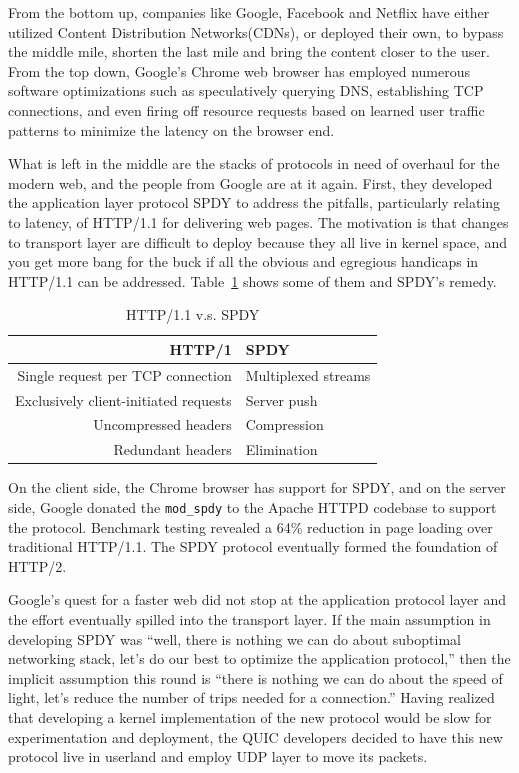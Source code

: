 \documentclass{sig-alternate-05-2015}
\begin{document}
From the bottom up, companies like Google, Facebook and Netflix have either utilized Content Distribution Networks(CDNs), or deployed their own, to bypass the middle mile, shorten the last mile and bring the content closer to the user. From the top down, Google's Chrome web browser has employed numerous software optimizations such as speculatively querying DNS, establishing TCP connections, and even firing off resource requests based on learned user traffic patterns to minimize the latency on the browser end.\cite{grigorik:chrome} 

What is left in the middle are the stacks of protocols in need of overhaul for the modern web, and the people from Google are at it again. First, they developed the application layer protocol SPDY to address the pitfalls, particularly relating to latency, of HTTP/1.1 for delivering web pages. The motivation is that changes to transport layer are difficult to deploy because they all live in kernel space, and you get more bang for the buck if all the obvious and egregious handicaps in HTTP/1.1 can be addressed. Table~\ref{tab:httpvspdy} shows some of them and SPDY's remedy.

\vspace*{-10pt}
\begin{table}[h]
\centering
\caption{HTTP/1.1 v.s. SPDY\cite{spdy}}
\label{tab:httpvspdy}
\begin{tabular}{|r|l|}
\hline
HTTP/1 & SPDY \\ \hline
Single request per TCP connection & Multiplexed streams \\ \hline
Exclusively client-initiated requests & Server push \\ \hline
Uncompressed headers & Compression \\ \hline
Redundant headers & Elimination \\ \hline
\end{tabular}
\end{table}

On the client side, the Chrome browser has support for SPDY, and on the server side, Google donated the \texttt{mod\_spdy} to the Apache HTTPD codebase to support the protocol. Benchmark testing revealed a 64\% reduction in page loading over traditional HTTP/1.1. The SPDY protocol eventually formed the foundation of HTTP/2.

Google's quest for a faster web did not stop at the application protocol layer and the effort eventually spilled into the transport layer. If the main assumption in developing SPDY was ``well, there is nothing we can do about suboptimal networking stack, let's do our best to optimize the application protocol,'' then the implicit assumption this round is ``there is nothing we can do about the speed of light, let's reduce the number of trips needed for a connection.''\cite{quic:announcement} Having realized that developing a kernel implementation of the new protocol would be slow for experimentation and deployment, the QUIC developers decided to have this new protocol live in userland and employ UDP layer to move its packets. 
\end{document}
